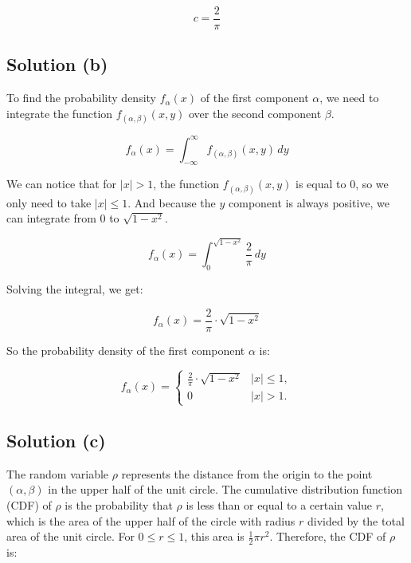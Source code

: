 \begin{equation}
    c = \frac{2}{\pi}
\end{equation}

\subsection*{Solution (b)}

To find the probability density $f_\alpha(x)$ of the first component $\alpha$, we need to integrate the function $f_{(\alpha, \beta)}(x, y)$ over the second component $\beta$.

\begin{equation}
    f_\alpha(x) = \int_{-\infty}^{\infty} f_{(\alpha, \beta)}(x, y) \, dy
\end{equation}

We can notice that for $|x| > 1$, the function $f_{(\alpha, \beta)}(x, y)$
is equal to $0$, so we only need to take $|x| \leq 1$.
And because the $y$ component is always positive, we can integrate from $0$ to $\sqrt{1 - x^2}$.

\begin{equation}
    f_\alpha(x) = \int_{0}^{\sqrt{1 - x^2}} \frac{2}{\pi} \, dy
\end{equation}

Solving the integral, we get:

\begin{equation}
    f_\alpha(x) = \frac{2}{\pi} \cdot \sqrt{1 - x^2}
\end{equation}

So the probability density of the first component $\alpha$ is:

\begin{equation}
    f_\alpha(x) =
    \begin{cases}
        \frac{2}{\pi} \cdot \sqrt{1 - x^2} & |x| \leq 1, \\
        0                                  & |x| > 1.
    \end{cases}
\end{equation}

\subsection*{Solution (c)}

The random variable \(\rho\) represents the distance from the origin to the point \((\alpha, \beta)\) in the upper half of the unit circle. The cumulative distribution function (CDF) of \(\rho\) is the probability that \(\rho\) is less than or equal to a certain value \(r\), which is the area of the upper half of the circle with radius \(r\) divided by the total area of the unit circle. For \(0 \leq r \leq 1\), this area is \(\frac{1}{2} \pi r^2\). Therefore, the CDF of \(\rho\) is:

